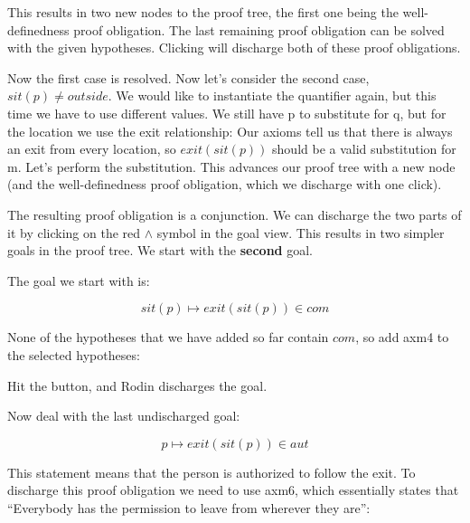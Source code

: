 This results in two new nodes to the proof tree, the first one being the well-definedness proof obligation.  The last remaining proof obligation can be solved with the given hypotheses.  Clicking  will discharge both of these proof obligations.

Now the first case is resolved.  Now let's consider the second case, $sit(p) \neq outside$.  We would like to instantiate the quantifier again, but this time we have to use different values.  We still have p to substitute for q, but for the location we use the exit relationship: Our axioms tell us that there is always an exit from every location, so $exit(sit(p))$ should be a valid substitution for m. Let's perform the substitution.  This advances our proof tree with a new node (and the well-definedness proof obligation, which we discharge with one click).

The resulting proof obligation is a conjunction.  We can discharge the two parts of it by clicking on the red $\land$ symbol in the goal view. This results in two simpler goals in the proof tree.  We start with the \textbf{second} goal.


The goal we start with is:

$$ sit(p) \mapsto exit(sit(p)) \in com $$

None of the hypotheses that we have added so far contain $com$, so add \textsf{axm4} to the selected hypotheses:


Hit the  button, and Rodin discharges the goal.

Now deal with the last undischarged goal:

$$ p \mapsto exit(sit(p)) \in aut $$

This statement means that the person is authorized to follow the exit. To discharge this proof obligation we need to use \textsf{axm6}, which essentially states that ``Everybody has the permission to leave from wherever they are'':

